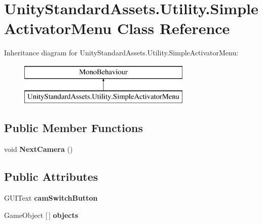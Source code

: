 \hypertarget{class_unity_standard_assets_1_1_utility_1_1_simple_activator_menu}{}\section{Unity\+Standard\+Assets.\+Utility.\+Simple\+Activator\+Menu Class Reference}
\label{class_unity_standard_assets_1_1_utility_1_1_simple_activator_menu}
Inheritance diagram for Unity\+Standard\+Assets.\+Utility.\+Simple\+Activator\+Menu\+:\begin{figure}[H]
\begin{center}
\leavevmode
\includegraphics[height=2.000000cm]{class_unity_standard_assets_1_1_utility_1_1_simple_activator_menu}
\end{center}
\end{figure}
\subsection*{Public Member Functions}
\begin{DoxyCompactItemize}
\item 
\mbox{\label{class_unity_standard_assets_1_1_utility_1_1_simple_activator_menu_a335468ed4d932d4aeb83a676c0a98b0e}} 
void {\bfseries Next\+Camera} ()
\end{DoxyCompactItemize}
\subsection*{Public Attributes}
\begin{DoxyCompactItemize}
\item 
\mbox{\label{class_unity_standard_assets_1_1_utility_1_1_simple_activator_menu_aeaeb5037872f98352277bb5772375866}} 
G\+U\+I\+Text {\bfseries cam\+Switch\+Button}
\item 
\mbox{\label{class_unity_standard_assets_1_1_utility_1_1_simple_activator_menu_a9f0191f5419960fe0445a392ac244318}} 
Game\+Object \mbox{[}$\,$\mbox{]} {\bfseries objects}
\end{DoxyCompactItemize}
